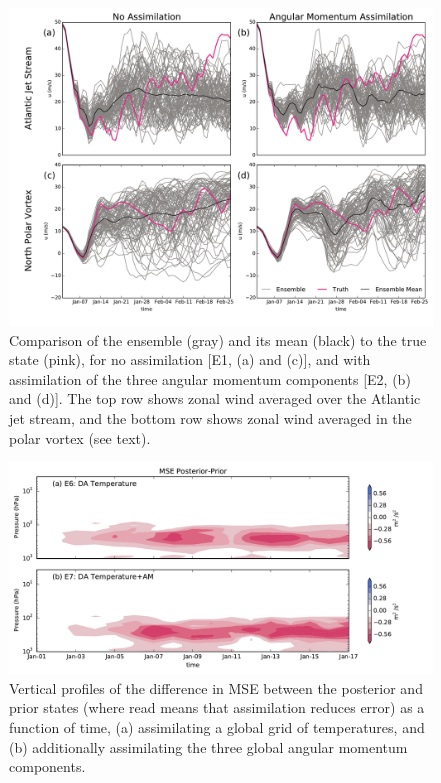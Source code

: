  \begin{figure}
	 \includegraphics[width=\textwidth]{Paper_figures/ERPDA_paper_point_checks.pdf}
	 \caption{Comparison of the ensemble (gray) and its mean (black) to the true state (pink), for no assimilation [E1, (a) and (c)], and with assimilation of the three angular momentum components [E2, (b) and (d)]. The top row shows zonal wind averaged over the Atlantic jet stream, and the bottom row shows zonal wind averaged in the polar vortex (see text).}
	 \label{fig:point_checks}
\end{figure}




 \begin{figure}
	 \includegraphics[width=\textwidth]{Paper_figures/ERPDA_paper_MSEincrement_comparison.pdf}
	 \caption{Vertical profiles of the difference in MSE between the posterior and prior states (where read means that assimilation reduces error) as a function of time, (a) assimilating a global grid of temperatures, and (b) additionally assimilating the three global angular momentum components.}
	 \label{fig:added_value_MSEincrement}
\end{figure}


